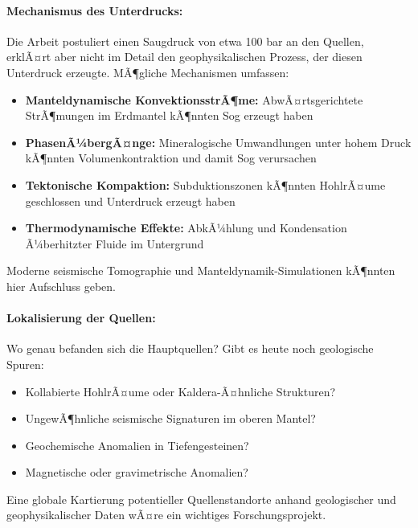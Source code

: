 ﻿\documentclass[12pt,a4paper]{report}
\begin{document}
\paragraph{Mechanismus des Unterdrucks:}
Die Arbeit postuliert einen Saugdruck von etwa 100 bar an den Quellen, erklÃ¤rt aber nicht im Detail den geophysikalischen Prozess, der diesen Unterdruck erzeugte. MÃ¶gliche Mechanismen umfassen:

\begin{itemize}
	\item \textbf{Manteldynamische KonvektionsstrÃ¶me:} AbwÃ¤rtsgerichtete StrÃ¶mungen im Erdmantel kÃ¶nnten Sog erzeugt haben
	
	\item \textbf{PhasenÃ¼bergÃ¤nge:} Mineralogische Umwandlungen unter hohem Druck kÃ¶nnten Volumenkontraktion und damit Sog verursachen
	
	\item \textbf{Tektonische Kompaktion:} Subduktionszonen kÃ¶nnten HohlrÃ¤ume geschlossen und Unterdruck erzeugt haben
	
	\item \textbf{Thermodynamische Effekte:} AbkÃ¼hlung und Kondensation Ã¼berhitzter Fluide im Untergrund
\end{itemize}

Moderne seismische Tomographie und Manteldynamik-Simulationen kÃ¶nnten hier Aufschluss geben.

\paragraph{Lokalisierung der Quellen:}
Wo genau befanden sich die Hauptquellen? Gibt es heute noch geologische Spuren:
\begin{itemize}
	\item Kollabierte HohlrÃ¤ume oder Kaldera-Ã¤hnliche Strukturen?
	\item UngewÃ¶hnliche seismische Signaturen im oberen Mantel?
	\item Geochemische Anomalien in Tiefengesteinen?
	\item Magnetische oder gravimetrische Anomalien?
\end{itemize}

Eine globale Kartierung potentieller Quellenstandorte anhand geologischer und geophysikalischer Daten wÃ¤re ein wichtiges Forschungsprojekt.
\end{document}
